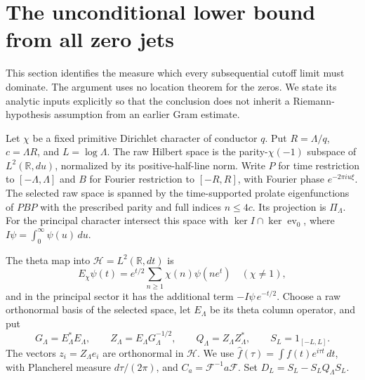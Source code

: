 \section{The unconditional lower bound from all zero jets}

This section identifies the measure which every subsequential cutoff limit
must dominate.  The argument uses no location theorem for the zeros.
We state its analytic inputs explicitly so that the conclusion does not
inherit a Riemann-hypothesis assumption from an earlier Gram estimate.

Let $\chi$ be a fixed primitive Dirichlet character of conductor $q$.
Put $R=\Lambda/q$, $c=\Lambda R$, and $L=\log\Lambda$.
The raw Hilbert space is the parity-$\chi(-1)$ subspace of
$L^2(\mathbb R,du)$, normalized by its positive-half-line norm.
Write $P$ for time restriction to $[-\Lambda,\Lambda]$ and $B$ for
Fourier restriction to $[-R,R]$, with Fourier phase $e^{-2\pi iu\xi}$.
The selected raw space is spanned by the time-supported prolate
eigenfunctions of $PBP$ with the prescribed parity and full indices
$n\leq4c$.  Its projection is $\Pi_\Lambda$.
For the principal character intersect this space with
$\ker I\cap\ker\operatorname{ev}_0$, where
$I\psi=\int_0^\infty\psi(u)\,du$.

The theta map into $\mathcal H=L^2(\mathbb R,dt)$ is
\[
 E_\chi\psi(t)=e^{t/2}\sum_{n\geq1}\chi(n)\psi(ne^t)
 \quad(\chi\ne1),
\]
and in the principal sector it has the additional term
$-I\psi\,e^{-t/2}$.
Choose a raw orthonormal basis of the selected space, let $E_\Lambda$
be its theta column operator, and put
\[
 G_\Lambda=E_\Lambda^*E_\Lambda,\qquad
 Z_\Lambda=E_\Lambda G_\Lambda^{-1/2},\qquad
 Q_\Lambda=Z_\Lambda Z_\Lambda^*,\qquad
 S_L=1_{[-L,L]}.
\]
The vectors $z_i=Z_\Lambda e_i$ are orthonormal in $\mathcal H$.
We use $\widehat f(\tau)=\int f(t)e^{i\tau t}\,dt$, with Plancherel
measure $d\tau/(2\pi)$, and $C_a=\mathcal F^{-1}a\mathcal F$.
Set $D_L=S_L-S_LQ_\Lambda S_L$.


